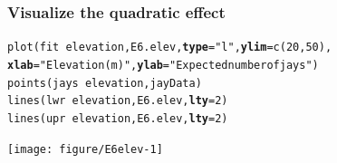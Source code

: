 \documentclass[color=usenames,dvipsnames]{beamer}\usepackage[]{graphicx}\usepackage[]{color}
\makeatletter
\newcommand{\hlnum}[1]{\textcolor[rgb]{0.69,0.494,0}{#1}}%
\newcommand{\hlstr}[1]{\textcolor[rgb]{0.749,0.012,0.012}{#1}}%
\newcommand{\hlopt}[1]{\textcolor[rgb]{0,0,0}{#1}}%
\newcommand{\hlstd}[1]{\textcolor[rgb]{0,0,0}{#1}}%
\newcommand{\hlkwc}[1]{\textcolor[rgb]{0,0,0}{\textbf{#1}}}%
\newcommand{\hlkwd}[1]{\textcolor[rgb]{0.004,0.004,0.506}{#1}}%
\newenvironment{kframe}{%
 \def\at@end@of@kframe{}%
 \ifinner\ifhmode%
  \def\at@end@of@kframe{\end{minipage}}%
  \begin{minipage}{\columnwidth}%
 \fi\fi%
 \def\FrameCommand##1{\hskip\@totalleftmargin \hskip-\fboxsep
 \colorbox{shadecolor}{##1}\hskip-\fboxsep
     \hskip-\linewidth \hskip-\@totalleftmargin \hskip\columnwidth}%
 \MakeFramed {\advance\hsize-\width
   \@totalleftmargin\z@ \linewidth\hsize
   \@setminipage}}%
 {\par\unskip\endMakeFramed%
 \at@end@of@kframe}
\newenvironment{knitrout}{}{} %
\makeatother
\begin{document}
\begin{frame}[fragile]
  \frametitle{Visualize the quadratic effect}
\begin{knitrout}\scriptsize
{}\color{fgcolor}\begin{kframe}
\begin{alltt}
\hlkwd{plot}\hlstd{(fit} \hlopt{~} \hlstd{elevation, E6.elev,} \hlkwc{type}\hlstd{=}\hlstr{"l"}\hlstd{,} \hlkwc{ylim}\hlstd{=}\hlkwd{c}\hlstd{(}\hlnum{20}\hlstd{,}\hlnum{50}\hlstd{),}
     \hlkwc{xlab}\hlstd{=}\hlstr{"Elevation (m)"}\hlstd{,} \hlkwc{ylab}\hlstd{=}\hlstr{"Expected number of jays"}\hlstd{)}
\hlkwd{points}\hlstd{(jays} \hlopt{~} \hlstd{elevation, jayData)}
\hlkwd{lines}\hlstd{(lwr} \hlopt{~} \hlstd{elevation, E6.elev,} \hlkwc{lty}\hlstd{=}\hlnum{2}\hlstd{)}
\hlkwd{lines}\hlstd{(upr} \hlopt{~} \hlstd{elevation, E6.elev,} \hlkwc{lty}\hlstd{=}\hlnum{2}\hlstd{)}
\end{alltt}
\end{kframe}
\end{knitrout}
\centering
\texttt{[image: figure/E6elev-1]} \\
\end{frame}
\end{document}
